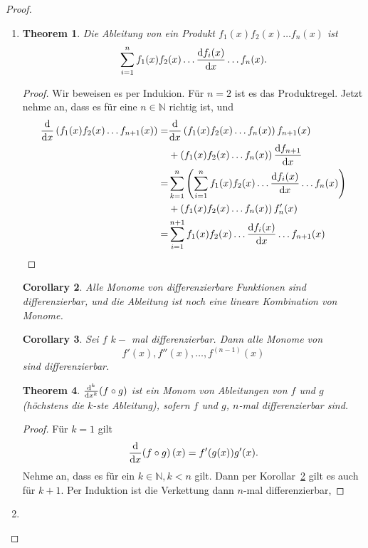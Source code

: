 \documentclass[prb,12pt]{revtex4-2}
\newtheorem{Theorem}{Theorem}
\newtheorem{Corollary}[Theorem]{Corollary}
\theoremstyle{definition}
\theoremstyle{definition}
\newcommand{\N}{\mathbb{N}}
\begin{document}
\begin{proof}
	\begin{enumerate}[label=\roman*)]
		\item 
			\begin{Theorem}
				Die Ableitung von ein Produkt $f_1(x)f_2(x)\dots f_n(x)$ ist \[
				\sum_{i=1}^n f_1(x)f_2(x)\dots \dv{f_i(x)}{x}\dots f_n(x).\]
			\end{Theorem}
			\begin{proof}
				Wir beweisen es per Indukion. F\"{u}r $n=2$ ist es das Produktregel. Jetzt nehme an, dass es f\"{u}r eine $n\in \N$ richtig ist, und 
				\begin{align*}
					\dv{x}\left( f_1(x)f_2(x)\dots f_{n+1}(x) \right) =& \dv{x}\left( f_1(x)f_2(x)\dots f_n(x) \right) f_{n+1}(x)\\
											   &+\left( f_1(x)f_2(x)\dots f_n(x) \right) \dv{f_{n+1}}{x}\\
					=& \sum_{k=1}^{n}\left( \sum_{i=1}^n f_1(x)f_2(x)\dots \dv{f_i(x)}{x}\dots f_n(x) \right)\\
					 &+\left( f_1(x)f_2(x)\dots f_n(x) \right) f_n'(x)\\
					=&\sum_{i=1}^{n+1} f_1(x)f_2(x)\dots \dv{f_i(x)}{x}\dots f_{n+1}(x)
				\end{align*}
			\end{proof}
			\begin{Corollary}\label{thm:ana2u2corollary1}
				Alle Monome von differenzierbare Funktionen sind differenzierbar, und die Ableitung ist noch eine lineare Kombination von Monome.
			\end{Corollary}
			\begin{Corollary}
				Sei $f$ $k-$ mal differenzierbar. Dann alle Monome von \[f'(x),f''(x),\dots, f^{(n-1)}(x)\] sind differenzierbar.
			\end{Corollary}
			\begin{Theorem}
				$\dv[k]{x}(f\circ g)$ ist ein Monom von Ableitungen von $f$ und $g$ (höchstens die $k$-ste Ableitung), sofern $f$ und $g$, $n$-mal differenzierbar sind.
			\end{Theorem}
			\begin{proof}
				F\"{u}r $k=1$ gilt
				\[
					\dv{x}(f\circ g)\left(x \right) =f'(g(x))g'(x)
				.\] 
				Nehme an, dass es f\"{u}r ein $k\in \N,k<n$ gilt. Dann per Korollar~\ref{thm:ana2u2corollary1} gilt es auch f\"{u}r $k+1$. Per Induktion ist die Verkettung dann $n$-mal differenzierbar,
			\end{proof}
		\item 

\end{enumerate}
\end{proof}
\end{document}
